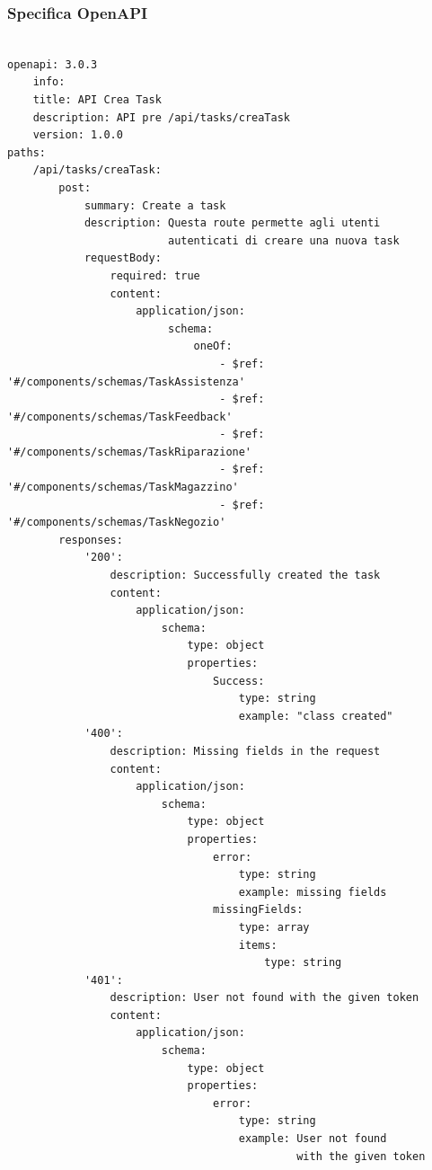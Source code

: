 \documentclass{report}
\begin{document}
\subsubsection*{Specifica OpenAPI}
\begin{verbatim}

openapi: 3.0.3
    info:
    title: API Crea Task
    description: API pre /api/tasks/creaTask
    version: 1.0.0
paths:
    /api/tasks/creaTask:
        post:
            summary: Create a task
            description: Questa route permette agli utenti
                         autenticati di creare una nuova task
            requestBody:
                required: true
                content:
                    application/json:
                         schema:
                             oneOf:
                                 - $ref: '#/components/schemas/TaskAssistenza'
                                 - $ref: '#/components/schemas/TaskFeedback'
                                 - $ref: '#/components/schemas/TaskRiparazione'
                                 - $ref: '#/components/schemas/TaskMagazzino'
                                 - $ref: '#/components/schemas/TaskNegozio'
        responses:
            '200':
                description: Successfully created the task
                content:
                    application/json:
                        schema:
                            type: object
                            properties:
                                Success:
                                    type: string
                                    example: "class created"
            '400':
                description: Missing fields in the request
                content:
                    application/json:
                        schema:
                            type: object
                            properties:
                                error:
                                    type: string
                                    example: missing fields
                                missingFields:
                                    type: array
                                    items:
                                        type: string
            '401':
                description: User not found with the given token
                content:
                    application/json:
                        schema:
                            type: object
                            properties:
                                error:
                                    type: string
                                    example: User not found
                                             with the given token

\end{verbatim}
\end{document}
